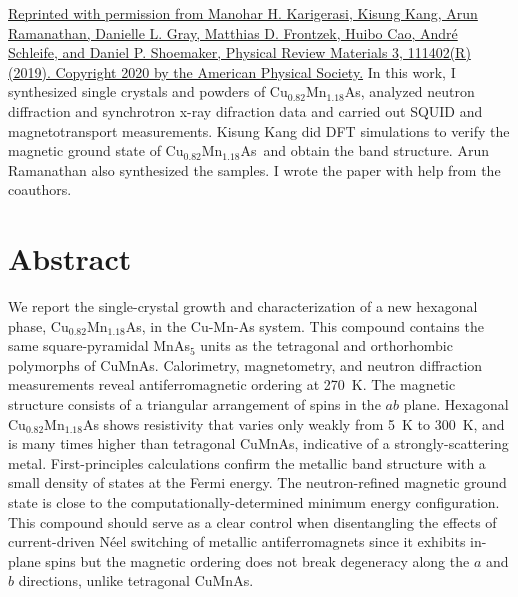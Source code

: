 \documentclass[10pt,doublespacing,edeposit]{uiucthesis2020}
\newcommand*{\cumnas}{Cu$_{0.82}$Mn$_{1.18}$As}
\begin{document}
\begin{mainmatter}

\hfill \break

\href{https://doi.org/10.1103/PhysRevMaterials.3.111402}{Reprinted with permission from Manohar H. Karigerasi, Kisung Kang, Arun Ramanathan, Danielle L. Gray, Matthias D. Frontzek, Huibo Cao, Andr\'e Schleife, and Daniel P. Shoemaker, Physical Review Materials 3, 111402(R) (2019). Copyright 2020 by the American Physical Society.} In this work, I synthesized single crystals and powders of \cumnas, analyzed neutron diffraction and synchrotron x-ray difraction data and carried out SQUID and magnetotransport measurements. Kisung Kang did DFT simulations to verify the magnetic ground state of \cumnas\ and obtain the band structure. Arun Ramanathan also synthesized the samples. I wrote the paper with help from the coauthors.


\section{Abstract}
We report the single-crystal growth and characterization of a new hexagonal phase, Cu$_{0.82}$Mn$_{1.18}$As, in the Cu-Mn-As system. 
This compound contains the same square-pyramidal MnAs$_5$ units as the tetragonal and orthorhombic polymorphs of CuMnAs.
Calorimetry, magnetometry, and neutron diffraction measurements reveal antiferromagnetic ordering at 270~K.
The magnetic structure consists of a triangular arrangement of spins in the $ab$ plane. 
Hexagonal Cu$_{0.82}$Mn$_{1.18}$As shows resistivity that varies only weakly from 5~K to 300~K, and is many times higher than tetragonal CuMnAs, indicative of a strongly-scattering metal.
First-principles calculations confirm the metallic band structure with a small density of states at the Fermi energy. The neutron-refined
magnetic ground state is close to the computationally-determined minimum energy configuration. This compound should serve as a clear control when disentangling the effects of current-driven N\'{e}el switching of metallic antiferromagnets since it exhibits in-plane spins but the magnetic ordering does not break degeneracy along the $a$ and $b$ directions, unlike tetragonal CuMnAs.


\end{mainmatter}
\end{document}
